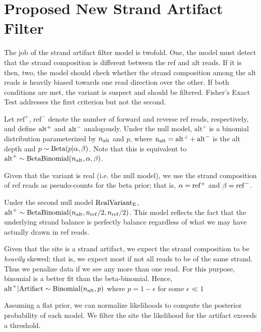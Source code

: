 \documentclass[11pt]{article}
\begin{document}

\section{Proposed New Strand Artifact Filter}

\bigbreak \noindent
The job of the strand artifact filter model is twofold. One, the model must detect that the strand composition is different between the ref and alt reads. If it is then, two, the model should check whether the strand composition among the alt reads is heavily biased towards one read direction over the other. If both conditions are met, the variant is suspect and should be filtered. Fisher's Exact Test addresses the first criterion but not the second. 

\bigbreak \noindent 
Let $\mathrm{ref}^+$, $\mathrm{ref}^-$ denote the number of forward and reverse ref reads, respectively, and define ${\rm alt^+}$ and ${\rm alt}^-$ analogously. Under the null model, $\mathrm{alt}^+$ is a binomial distribution parameterized by $n_{\rm alt}$ and $p$, where ${\rm n_{\rm alt}} = {\rm alt^+} + {\rm alt}^-$ is the alt depth and $p \sim {\rm Beta}(p|\alpha, \beta)$.  Note that this is equivalent to $\mathrm{alt}^+ \sim {\rm BetaBinomial}(n_{\rm alt}, \alpha, \beta)$. 

\bigbreak \noindent 
Given that the variant is real (i.e. the null model),  we use the strand composition of ref reads as pseudo-counts for the beta prior; that is, $\alpha = {\rm ref^+}$ and $\beta = {\rm ref}^-$. 

\bigbreak \noindent 
Under the second null model ${\rm Real Variant_E}$, $\mathrm{alt}^+ \sim {\rm BetaBinomial}(n_{\rm alt},n_{\rm ref}/2, n_{\rm ref}/2)$. This model reflects the fact that the underlying strand balance is perfectly balance regardless of what we may have actually drawn in ref reads.

\bigbreak \noindent
Given that the site is a strand artifact, we expect the strand composition to be \emph{heavily} skewed; that is, we expect most if not all reads to be of the same strand. Thus we penalize data if we see any more than one read. 
For this purpose, binomial is a better fit than the beta-binomial.  Hence, $\mathrm{alt}^+ | {\rm Artifact} \sim {\rm Binomial}(n_{\rm alt}, p)$ where $p = 1 - \epsilon$ for some $\epsilon \ll 1$

\bigbreak \noindent
Assuming a flat prior, we can normalize likelihoods to compute the posterior probability of each model. We filter the site the likelihood for the artifact exceeds a threshold.
\end{document}
